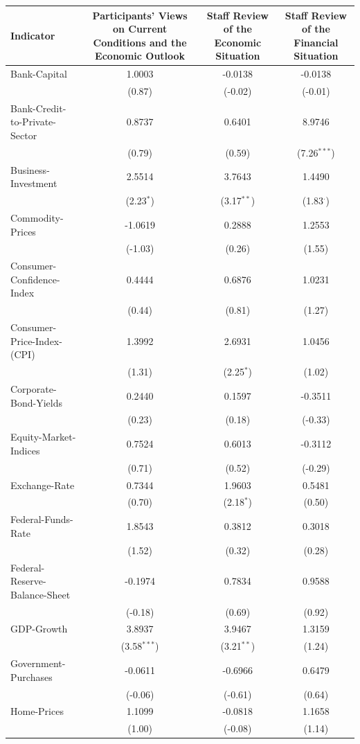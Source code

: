 \begin{tabular}{lccc}
\hline
Indicator & Participants' Views on Current Conditions and the Economic Outlook & Staff Review of the Economic Situation & Staff Review of the Financial Situation \\
\hline
Bank-Capital & 1.0003 & -0.0138 & -0.0138 \\
 & (0.87) & (-0.02) & (-0.01) \\
Bank-Credit-to-Private-Sector & 0.8737 & 0.6401 & 8.9746 \\
 & (0.79) & (0.59) & (7.26$^{***}$) \\
Business-Investment & 2.5514 & 3.7643 & 1.4490 \\
 & (2.23$^{*}$) & (3.17$^{**}$) & (1.83$^{\cdot}$) \\
Commodity-Prices & -1.0619 & 0.2888 & 1.2553 \\
 & (-1.03) & (0.26) & (1.55) \\
Consumer-Confidence-Index & 0.4444 & 0.6876 & 1.0231 \\
 & (0.44) & (0.81) & (1.27) \\
Consumer-Price-Index-(CPI) & 1.3992 & 2.6931 & 1.0456 \\
 & (1.31) & (2.25$^{*}$) & (1.02) \\
Corporate-Bond-Yields & 0.2440 & 0.1597 & -0.3511 \\
 & (0.23) & (0.18) & (-0.33) \\
Equity-Market-Indices & 0.7524 & 0.6013 & -0.3112 \\
 & (0.71) & (0.52) & (-0.29) \\
Exchange-Rate & 0.7344 & 1.9603 & 0.5481 \\
 & (0.70) & (2.18$^{*}$) & (0.50) \\
Federal-Funds-Rate & 1.8543 & 0.3812 & 0.3018 \\
 & (1.52) & (0.32) & (0.28) \\
Federal-Reserve-Balance-Sheet & -0.1974 & 0.7834 & 0.9588 \\
 & (-0.18) & (0.69) & (0.92) \\
GDP-Growth & 3.8937 & 3.9467 & 1.3159 \\
 & (3.58$^{***}$) & (3.21$^{**}$) & (1.24) \\
Government-Purchases & -0.0611 & -0.6966 & 0.6479 \\
 & (-0.06) & (-0.61) & (0.64) \\
Home-Prices & 1.1099 & -0.0818 & 1.1658 \\
 & (1.00) & (-0.08) & (1.14) \\

\end{tabular}
